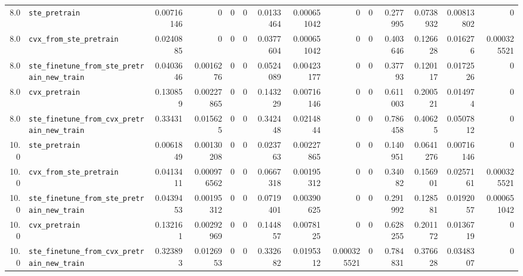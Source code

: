 \begin{longtable}{@{}r l *{12}{r}@{}}
8.0 & \texttt{ste\_pretrain} & 0.00716146 & 0 & 0 & 0 & 0.0133464 & 0.000651042 & 0 & 0 & 0.277995 & 0.0738932 & 0.00813802 & 0 \\
8.0 & \texttt{cvx\_from\_ste\_pretrain} & 0.0240885 & 0 & 0 & 0 & 0.0377604 & 0.000651042 & 0 & 0 & 0.403646 & 0.126628 & 0.016276 & 0.000325521 \\
8.0 & \texttt{ste\_finetune\_from\_ste\_pretrain\_new\_train} & 0.0403646 & 0.0016276 & 0 & 0 & 0.0524089 & 0.00423177 & 0 & 0 & 0.37793 & 0.120117 & 0.0172526 & 0 \\
8.0 & \texttt{cvx\_pretrain} & 0.130859 & 0.00227865 & 0 & 0 & 0.143229 & 0.00716146 & 0 & 0 & 0.611003 & 0.200521 & 0.014974 & 0 \\
8.0 & \texttt{ste\_finetune\_from\_cvx\_pretrain\_new\_train} & 0.33431 & 0.015625 & 0 & 0 & 0.342448 & 0.0214844 & 0 & 0 & 0.786458 & 0.40625 & 0.0507812 & 0 \\
10.0 & \texttt{ste\_pretrain} & 0.0061849 & 0.00130208 & 0 & 0 & 0.023763 & 0.00227865 & 0 & 0 & 0.140951 & 0.0641276 & 0.00716146 & 0 \\
10.0 & \texttt{cvx\_from\_ste\_pretrain} & 0.0413411 & 0.000976562 & 0 & 0 & 0.0667318 & 0.00195312 & 0 & 0 & 0.34082 & 0.156901 & 0.0257161 & 0.000325521 \\
10.0 & \texttt{ste\_finetune\_from\_ste\_pretrain\_new\_train} & 0.0439453 & 0.00195312 & 0 & 0 & 0.0719401 & 0.00390625 & 0 & 0 & 0.291992 & 0.128581 & 0.0192057 & 0.000651042 \\
10.0 & \texttt{cvx\_pretrain} & 0.132161 & 0.00292969 & 0 & 0 & 0.144857 & 0.0078125 & 0 & 0 & 0.628255 & 0.201172 & 0.0136719 & 0 \\
10.0 & \texttt{ste\_finetune\_from\_cvx\_pretrain\_new\_train} & 0.323893 & 0.0126953 & 0 & 0 & 0.332682 & 0.0195312 & 0.000325521 & 0 & 0.784831 & 0.376628 & 0.0348307 & 0 \\
\end{longtable}


